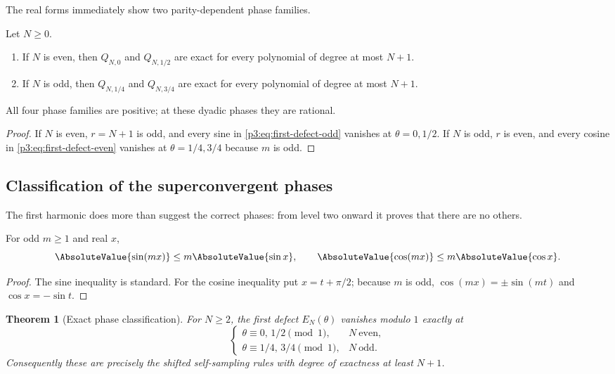\documentclass[11pt,oneside]{article}
\numberwithin{equation}{section}
\newtheorem{theorem}{Theorem}[section]
\theoremstyle{definition}
\theoremstyle{remark}
\begin{document}
The real forms immediately show two parity-dependent phase families.

\begin{corollary}
\label{p3:cor:forced-superconvergence}
Let $N\ge0$.
\begin{enumerate}
\item If $N$ is even, then $Q_{N,0}$ and $Q_{N,1/2}$ are exact for every polynomial of degree at most $N+1$.
\item If $N$ is odd, then $Q_{N,1/4}$ and $Q_{N,3/4}$ are exact for every polynomial of degree at most $N+1$.
\end{enumerate}
All four phase families are positive; at these dyadic phases they are rational.
\end{corollary}

\begin{proof}
If $N$ is even, $r=N+1$ is odd, and every sine in \eqref{p3:eq:first-defect-odd} vanishes at $\theta=0,1/2$.  If $N$ is odd, $r$ is even, and every cosine in \eqref{p3:eq:first-defect-even} vanishes at $\theta=1/4,3/4$ because $m$ is odd.
\end{proof}

\subsection{Classification of the superconvergent phases}

The first harmonic does more than suggest the correct phases: from level two onward it proves that there are no others.

\begin{lemma}
\label{p3:lem:odd-trig-factor}
For odd $m\ge1$ and real $x$,
\begin{equation}
 \AbsoluteValue{\sin(mx)}\le m\AbsoluteValue{\sin x},
 \qquad
 \AbsoluteValue{\cos(mx)}\le m\AbsoluteValue{\cos x}.
 \label{p3:eq:odd-trig-factor}
\end{equation}
\end{lemma}

\begin{proof}
The sine inequality is standard.  For the cosine inequality put $x=t+\pi/2$; because $m$ is odd, $\cos(mx)=\pm\sin(mt)$ and $\cos x=-\sin t$.
\end{proof}

\begin{theorem}[Exact phase classification]
\label{p3:thm:phase-classification}
For $N\ge2$, the first defect $E_N(\theta)$ vanishes modulo $1$ exactly at
\begin{equation}
 \begin{cases}
 \theta\equiv0,\,1/2\pmod1,&N\ \text{even},\\
 \theta\equiv1/4,\,3/4\pmod1,&N\ \text{odd}.
 \end{cases}
 \label{p3:eq:phase-classification}
\end{equation}
Consequently these are precisely the shifted self-sampling rules with degree of exactness at least $N+1$.
\end{theorem}
\end{document}
